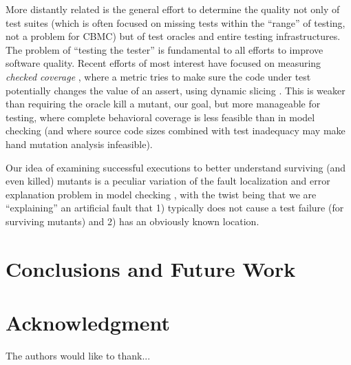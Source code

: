 \documentclass[conference]{IEEEtran}
\begin{document}
More distantly related is the general effort to determine the quality
not only of test suites (which is often focused on missing tests
within the ``range'' of testing, not a problem for CBMC) but of test
oracles and entire testing infrastructures.  The problem of ``testing
the tester'' \cite{WODA09} is fundamental to all efforts
to improve software quality.  Recent efforts of most interest have
focused on measuring \emph{checked coverage} \cite{CheckedCov,CheckedJournal,ThereYet}, where
a metric tries to make sure the code under test potentially changes
the value of an assert, using dynamic slicing \cite{DynSlice,Tip}.  This is weaker than requiring the oracle kill
a mutant, our goal, but more manageable for testing, where complete
behavioral coverage is less feasible than in model checking (and where
source code sizes combined with test inadequacy may make hand mutation analysis infeasible).

Our idea of examining successful executions to better understand
surviving (and even killed) mutants is a peculiar variation of the
fault localization and error explanation problem in model checking
\cite{GroceDist}, with the twist being that we are ``explaining'' an
artificial fault that 1) typically does not cause a test failure (for
surviving mutants) and 2) has an obviously known location.

\section{Conclusions and Future Work}

\section*{Acknowledgment}


The authors would like to thank...







%
%
%



\end{document}
